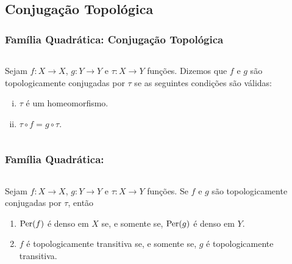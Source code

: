 \subsection{Conjugação Topológica}


\begin{frame}
\vspace{5pt}
\frametitle{Família Quadrática: Conjugação Topológica}
\begin{columns}
\column{\dimexpr\paperwidth-15pt}

\begin{definition}
Sejam $f: X \to X$, $g: Y \to Y$ e $\tau: X \to Y$ funções. Dizemos que $f$ e $g$ são topologicamente conjugadas por $\tau$ se as seguintes condições são válidas:
\begin{enumerate}[i.]
\item $\tau$ é um homeomorfismo.
\item $\tau \circ f = g \circ \tau$.
\end{enumerate}
\end{definition}

\end{columns}
\end{frame}


\begin{frame}
\vspace{5pt}
\frametitle{Família Quadrática: \subsecname}
\begin{columns}
\column{\dimexpr\paperwidth-15pt}

\begin{proposition}
Sejam $f: X \to X$, $g: Y \to Y$ e $\tau: X \to Y$ funções. Se $f$ e $g$ são topologicamente conjugadas por $\tau$, então
\begin{enumerate}
\item $\operatorname{Per}(f)$ é denso em $X$ se, e somente se, $\operatorname{Per}(g)$ é denso em $Y$.
\item $f$ é topologicamente transitiva se, e somente se, $g$ é topologicamente transitiva.
\end{enumerate}
\end{proposition}

\end{columns}
\end{frame}


